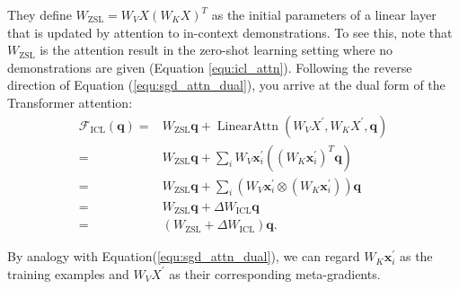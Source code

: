 They define $W_{\text{ZSL}} = W_{V} X \left( W_{K} X \right)^T$ as the initial parameters of a linear layer that is updated by attention to in-context demonstrations.
To see this, note that $W_{\text{ZSL}}$ is the attention result in the zero-shot learning setting where no demonstrations are given (Equation \ref{equ:icl_attn}). 
Following the reverse direction of Equation (\ref{equ:sgd_attn_dual}), you arrive at the dual form of the Transformer attention: 
\begin{equation}
    \begin{aligned}
        \mathcal{F}_{\text{ICL}}(\mathbf{q})
        = & W_{\text{ZSL}} \mathbf{q} + \operatorname{LinearAttn} \left( W_{V} X^{\prime}, W_{K} X^{\prime}, \mathbf{q} \right) \\
        = & W_{\text{ZSL}} \mathbf{q} + \sum_i W_{V} \textbf{x}^{\prime}_i \left( \left( W_{K} \textbf{x}^{\prime}_i \right)^T \mathbf{q} \right) \\
        = & W_{\text{ZSL}} \mathbf{q} + \sum_i \left( W_{V} \textbf{x}^{\prime}_i \otimes \left( W_{K} \textbf{x}^{\prime}_i \right) \right) \mathbf{q} \\
        = & W_{\text{ZSL}} \mathbf{q} + \Delta W_{\text{ICL}} \mathbf{q} \\
        = & \left( W_{\text{ZSL}} + \Delta W_{\text{ICL}} \right) \mathbf{q}. 
    \end{aligned}
    \label{equ:icl_opti_dual}
\end{equation}

By analogy with Equation(\ref{equ:sgd_attn_dual}), we can regard $W_{K} \textbf{x}^{\prime}_i$ as the training examples and $W_{V} X^{\prime}$ as their corresponding meta-gradients. 



